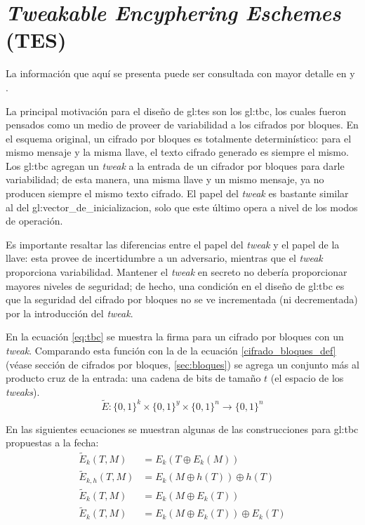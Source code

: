%
%

\section{\textit{Tweakable Encyphering Eschemes} (TES)}

La información que aquí se presenta puede ser consultada con mayor detalle en
\cite{cifradores_de_disco} y \cite{tweaks}.

La principal motivación para el diseño de \gls{gl:tes} son los \gls{gl:tbc},
los cuales fueron pensados como un medio de proveer de variabilidad a
los cifrados por bloques. En el esquema original, un cifrado por bloques es
totalmente determinístico: para el mismo mensaje y la misma llave, el texto
cifrado generado es siempre el mismo. Los \gls{gl:tbc} agregan un
\textit{tweak} a la entrada de un cifrador por bloques para darle
variabilidad; de esta manera, una misma llave y un mismo mensaje, ya no
producen siempre el mismo texto cifrado. El papel del \textit{tweak} es
bastante similar al del \gls{gl:vector_de_inicializacion}, solo que este
último opera a nivel de los modos de operación.

Es importante resaltar las diferencias entre el papel del \textit{tweak} y el
papel de la llave: esta provee de incertidumbre a un adversario,
mientras que el \textit{tweak} proporciona variabilidad. Mantener el
\textit{tweak} en secreto no debería proporcionar mayores niveles de
seguridad; de hecho, una condición en el diseño de \gls{gl:tbc} es que la
seguridad del cifrado por bloques no se ve incrementada (ni decrementada) por
la introducción del \textit{tweak}.

En la ecuación \ref{eq:tbc} se muestra la firma para un cifrado por bloques
con un \textit{tweak}. Comparando esta función con la de la ecuación
\ref{cifrado_bloques_def} (véase sección de cifrados por bloques,
\ref{sec:bloques}) se agrega un conjunto más al producto cruz de la entrada:
una cadena de bits de tamaño $ t $ (el espacio de los \textit{tweaks}).
\begin{equation}
  \label{eq:tbc}
  \tilde{E}: \{0,1\}^k \times \{0,1\}^y \times \{0,1\}^n
  \longrightarrow \{0,1\}^n
\end{equation}

En las siguientes ecuaciones se muestran algunas de las construcciones para
\gls{gl:tbc} propuestas a la fecha:
\begin{align}
  \label{tbc_trivial}
  \tilde{E}_k(T, M) &= E_k(T \oplus E_k(M)) \\
  \label{tbc_lrw}
  \tilde{E}_{k, h}(T, M) &= E_k(M \oplus h(T)) \oplus h(T) \\
  \label{tbc_we}
  \tilde{E}_{k}(T, M) &= E_k(M \oplus E_k(T)) \\
  \label{tbc_xex}
  \tilde{E}_{k}(T, M) &= E_k(M \oplus E_k(T)) \oplus E_k(T)
\end{align}

